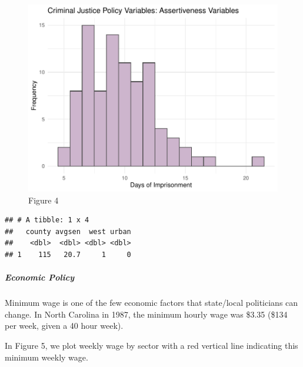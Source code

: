 \documentclass[]{article}
\newenvironment{Shaded}{\begin{snugshade}}{\end{snugshade}}
\newcommand{\KeywordTok}[1]{\textcolor[rgb]{0.13,0.29,0.53}{\textbf{#1}}}
\newcommand{\NormalTok}[1]{#1}
\newcommand{\OperatorTok}[1]{\textcolor[rgb]{0.81,0.36,0.00}{\textbf{#1}}}
\newcommand{\StringTok}[1]{\textcolor[rgb]{0.31,0.60,0.02}{#1}}
\let\oldsubparagraph\subparagraph
\renewcommand{\subparagraph}[1]{\oldsubparagraph{#1}\mbox{}}
\begin{document}
\begin{figure}

{\centering \includegraphics{lab_3_v7_files/figure-latex/unnamed-chunk-16-1} 

}

\caption{Figure 4}\label{fig:unnamed-chunk-16}
\end{figure}

\begin{Shaded}
\end{Shaded}

\begin{verbatim}
## # A tibble: 1 x 4
##   county avgsen  west urban
##    <dbl>  <dbl> <dbl> <dbl>
## 1    115   20.7     1     0
\end{verbatim}

\hypertarget{economic-policy-1}{%
\subparagraph{Economic Policy}\label{economic-policy-1}}

Minimum wage is one of the few economic factors that state/local
politicians can change. In North Carolina in 1987, the minimum hourly
wage was \$3.35 (\$134 per week, given a 40 hour week).

In Figure 5, we plot weekly wage by sector with a red vertical line
indicating this minimum weekly wage.
\end{document}
